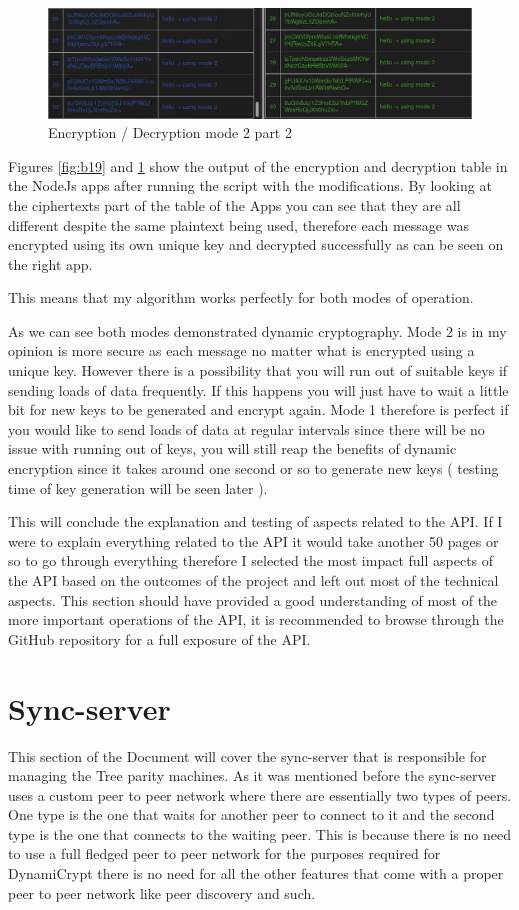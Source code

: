 \begin{figure}[!h]
  \centering
      \includegraphics[width=1\textwidth]{Figures/b20.png}
  \caption[Encryption / Decryption mode 2 part 2]{Encryption / Decryption mode 2 part 2}
  \label{fig:b20}
\end{figure}
\FloatBarrier
Figures \ref{fig:b19} and \ref{fig:b20} show the output of the encryption and decryption table in the NodeJs apps after running the script with the modifications.
By looking at the ciphertexts part of the table of the Apps you can see that they are all different despite the same plaintext being used, therefore each message was encrypted using its own unique key and decrypted successfully as can be seen on the right app. 

This means that my algorithm works perfectly for both modes of operation.

As we can see both modes demonstrated dynamic cryptography. Mode 2 is in my opinion is more secure as each message no matter what is encrypted using a unique key. However there is a possibility that you will run out of suitable keys if sending loads of data frequently. If this happens you will just have to wait a little bit for new keys to be generated and encrypt again. 
Mode 1 therefore is perfect if you would like to send loads of data at regular intervals since there will be no issue with running out of keys, you will still reap the benefits of dynamic encryption since it takes around one second or so to generate new keys ( testing time of key generation will be seen later ). 

This will conclude the explanation and testing of aspects related to the API. If I were to explain everything related to the API it would take another 50 pages or so to go through everything therefore I selected the most impact full aspects of the API based on the outcomes of the project and left out most of the technical aspects. This section should have provided a good understanding of most of the more important operations of the API, it is recommended to browse through the GitHub repository for a full exposure of the API.

\section{Sync-server}
This section of the Document will cover the sync-server that is responsible for managing the Tree parity machines. As it was mentioned before the sync-server uses a custom peer to peer network where there are essentially two types of peers. One type is the one that waits for another peer to connect to it and the second type is the one that connects to the waiting peer. This is because there is no need to use a full fledged peer to peer network for the purposes required for DynamiCrypt there is no need for all the other features that come with a proper peer to peer network like peer discovery and such.

